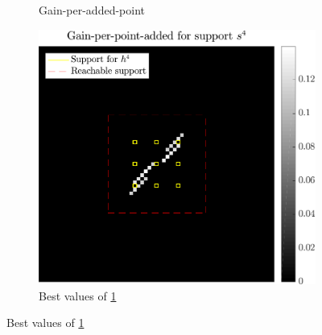\begin{figure}[!ht]
\begin{subfigure}[b]{0.34\linewidth}
\caption{Gain-per-added-point}\label{fig_beforeafter-gain}
\end{subfigure}
\begin{subfigure}[b]{0.34\linewidth}\centering
\includegraphics[width=\linewidth]{figures/before_after/before_gain_bestvalues.pdf}
\caption{Best values of \ref{fig_beforeafter-gain}}\label{fig_beforeafter-gain_best}
\end{subfigure}


\end{figure}
